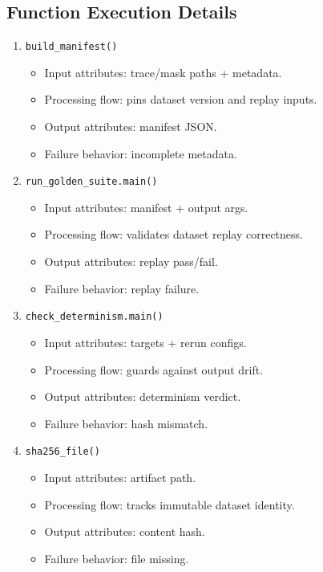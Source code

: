 \documentclass[11pt,a4paper]{article}
\begin{document}
\subsection*{Function Execution Details}
\begin{enumerate}[leftmargin=*]
  \item \texttt{build\_manifest()}
  \begin{itemize}[leftmargin=*]
    \item Input attributes: trace/mask paths + metadata.
    \item Processing flow: pins dataset version and replay inputs.
    \item Output attributes: manifest JSON.
    \item Failure behavior: incomplete metadata.
  \end{itemize}
  \item \texttt{run\_golden\_suite.main()}
  \begin{itemize}[leftmargin=*]
    \item Input attributes: manifest + output args.
    \item Processing flow: validates dataset replay correctness.
    \item Output attributes: replay pass/fail.
    \item Failure behavior: replay failure.
  \end{itemize}
  \item \texttt{check\_determinism.main()}
  \begin{itemize}[leftmargin=*]
    \item Input attributes: targets + rerun configs.
    \item Processing flow: guards against output drift.
    \item Output attributes: determinism verdict.
    \item Failure behavior: hash mismatch.
  \end{itemize}
  \item \texttt{sha256\_file()}
  \begin{itemize}[leftmargin=*]
    \item Input attributes: artifact path.
    \item Processing flow: tracks immutable dataset identity.
    \item Output attributes: content hash.
    \item Failure behavior: file missing.
  \end{itemize}
\end{enumerate}
\end{document}
